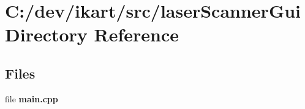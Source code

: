 \section{C\+:/dev/ikart/src/laser\+Scanner\+Gui Directory Reference}
\label{dir_45f6e956f71aa06d3df074bcc5e0dcc3}
\subsection*{Files}
\begin{DoxyCompactItemize}
\item 
file {\bfseries main.\+cpp}
\end{DoxyCompactItemize}
